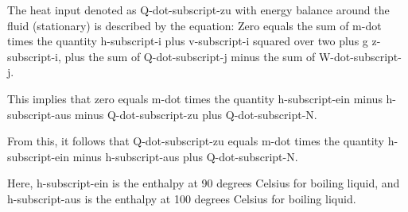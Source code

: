 The heat input denoted as Q-dot-subscript-zu with energy balance around the fluid (stationary) is described by the equation:
Zero equals the sum of m-dot times the quantity h-subscript-i plus v-subscript-i squared over two plus g z-subscript-i, plus the sum of Q-dot-subscript-j minus the sum of W-dot-subscript-j.

This implies that zero equals m-dot times the quantity h-subscript-ein minus h-subscript-aus minus Q-dot-subscript-zu plus Q-dot-subscript-N.

From this, it follows that Q-dot-subscript-zu equals m-dot times the quantity h-subscript-ein minus h-subscript-aus plus Q-dot-subscript-N.

Here, h-subscript-ein is the enthalpy at 90 degrees Celsius for boiling liquid, and h-subscript-aus is the enthalpy at 100 degrees Celsius for boiling liquid.